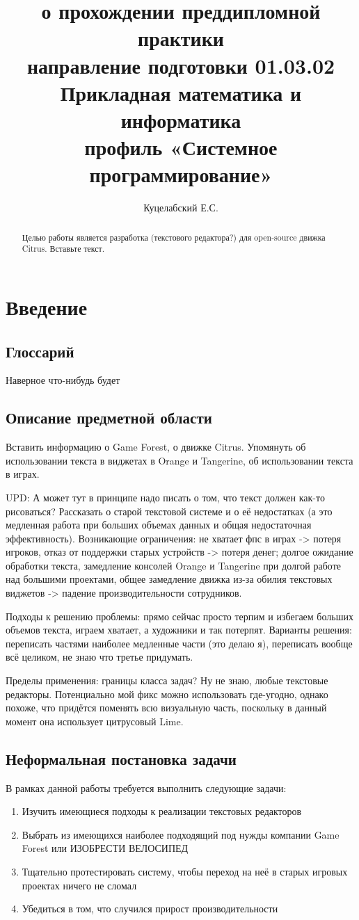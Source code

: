 \documentclass{fefu}
\title{о прохождении преддипломной практики\\направление подготовки 01.03.02 Прикладная математика и информатика\\профиль «Системное программирование»}
\author{Куцелабский Е.С.}
\begin{document}
	\makereporttitle
	\maketableofcontents
	
	\begin{abstract}
		Целью работы является разработка (текстового редактора?) для open-source движка Citrus. Вставьте текст.
	\end{abstract}

	\section{Введение}
	\subsection{Глоссарий}
	Наверное что-нибудь будет		
	\subsection{Описание предметной области}
	\par Вставить информацию о Game Forest, о движке Citrus. Упомянуть об использовании текста в виджетах в Orange и Tangerine, об использовании текста в играх.	
	\par UPD: А может тут в принципе надо писать о том, что текст должен как-то рисоваться?
	Рассказать о старой текстовой системе и о её недостатках (а это медленная работа при больших объемах данных и общая недостаточная эффективность). Возникающие ограничения: не хватает фпс в играх -> потеря игроков, отказ от поддержки старых устройств -> потеря денег; долгое ожидание обработки текста, замедление консолей Orange и Tangerine при долгой работе над большими проектами, общее замедление движка из-за обилия текстовых виджетов -> падение производительности сотрудников.	
	\par Подходы к решению проблемы: прямо сейчас просто терпим и избегаем больших объемов текста, играем хватает, а художники и так потерпят. Варианты решения: переписать частями наиболее медленные части (это делаю я), переписать вообще всё целиком, не знаю что третье придумать.
	\par Пределы применения: границы класса задач? Ну не знаю, любые текстовые редакторы. Потенциально мой фикс можно использовать где-угодно, однако похоже, что придётся поменять всю визуальную часть, поскольку в данный момент она использует цитрусовый Lime.		
	\subsection{Неформальная постановка задачи}
	В рамках данной работы требуется выполнить следующие задачи:
	\begin{enumerate}
		\item Изучить имеющиеся подходы к реализации текстовых редакторов
		\item Выбрать из имеющихся наиболее подходящий под нужды компании Game Forest или ИЗОБРЕСТИ ВЕЛОСИПЕД
		\item Тщательно протестировать систему, чтобы переход на неё в старых игровых проектах ничего не сломал
		\item Убедиться в том, что случился прирост производительности
	\end{enumerate}
\end{document}

